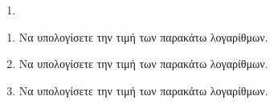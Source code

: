 \documentclass[twoside,nofonts,internet]{askhseis}
\begin{document}
\thewria
\begin{enumerate}
\item 
\end{enumerate}
\twocolkentro{\askhseis}
\begin{enumerate}
\item Να υπολογίσετε την τιμή των παρακάτω λογαρίθμων.
\begin{multicols}{4}
\end{multicols}
\item Να υπολογίσετε την τιμή των παρακάτω λογαρίθμων.
\begin{multicols}{3}
\end{multicols}
\item Να υπολογίσετε την τιμή των παρακάτω λογαρίθμων.
\begin{multicols}{3}
\end{multicols}

\end{enumerate}
\end{document}
